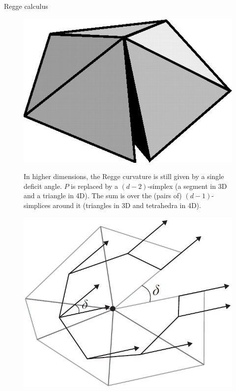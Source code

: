 \documentclass[12pt,titlepage]{article}
\begin{document}
\begin{frame}{Regge calculus}
    \begin{list}{\,}{\leftmargin=1em \itemindent=0em}
        \item<1-> \noindent\FloatBarrier
        \begin{figure}[!ht]
            \begin{minipage}{0.25\linewidth}
                \includegraphics[width=\linewidth]{4.4.png}
                \caption{}
                \label{fig:4.4}
            \end{minipage}
            \begin{minipage}{0.75\linewidth}
                In higher dimensions, the Regge curvature is still given by a single deficit angle. $P$ is replaced by a $(d-2)$-simplex (a segment in 3D and a triangle in 4D). The sum is over the (pairs of) $(d-1)$-simplices around it (triangles in 3D and tetrahedra in 4D).
            \end{minipage}
        \end{figure}\FloatBarrier
        \item<2-> \noindent\FloatBarrier
        \begin{figure}[!ht]
            \begin{minipage}{0.3\linewidth}
                \includegraphics[width=\linewidth]{4.5.png}

\end{minipage}
\end{figure}
\end{list}
\end{frame}
\end{document}
